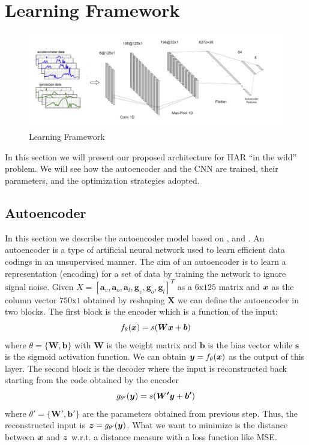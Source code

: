 \section{Learning Framework}
\label{sec:learning_framework}

\begin{figure}[h]
	\centering
	\includegraphics[width=1\textwidth]{images/full_architecture.jpg}
	\caption{Learning Framework}
	\label{fig:proposed-architecture}
\end{figure}

In this section we will present our proposed architecture for HAR ``in
the wild'' problem. We will see how the autoencoder and the CNN are
trained, their parameters, and the optimization strategies adopted.

\subsection{Autoencoder}
\label{subsec:autoencoder}

In this section we describe the autoencoder model based on
\cite{vincent2010stacked}, \cite{gu2018locomotion} and
\cite{gao2019human}. An autoencoder is a type of artificial neural
network used to learn efficient data codings in an unsupervised
manner. The aim of an autoencoder is to learn a representation
(encoding) for a set of data by training the network to ignore signal
noise. Given $X = [ \boldsymbol{a}_v, \boldsymbol{a}_o,
  \boldsymbol{a}_l, \boldsymbol{g}_v, \boldsymbol{g}_o,
  \boldsymbol{g}_l ]^T$ as a $6\text{x}125$ matrix and $\boldsymbol{x}$ as the
column vector $750\text{x}1$ obtained by reshaping $\boldsymbol{X}$ we
can define the autoencoder in two blocks. The first block is the
encoder which is a function of the input:
\begin{equation}
  f_\theta(\boldsymbol{x}) = s(\boldsymbol{W}\boldsymbol{x} + \boldsymbol{b})
\end{equation}
where $\theta = \{ \boldsymbol{W}, \boldsymbol{b} \}$ with
$\boldsymbol{W}$ is the weight matrix and $\boldsymbol{b}$ is the bias
vector while $\boldsymbol{s}$ is the sigmoid activation function. We
can obtain $\boldsymbol{y} = f_\theta(\boldsymbol{x})$ as the output of this
layer. The second block is the decoder where the input is
reconstructed back starting from the code obtained by the encoder
\begin{equation}
  g_{\theta'}(\boldsymbol{y}) = s(\boldsymbol{W'}\boldsymbol{y} + \boldsymbol{b'})
\end{equation}
where $\theta' = \{ \boldsymbol{W'}, \boldsymbol{b'} \}$ are the
parameters obtained from previous step. Thus, the reconstructed input
is $\boldsymbol{z} = g_{\theta'}(\boldsymbol{y})$. What we want to minimize is the distance
between $\boldsymbol{x}$ and $\boldsymbol{z}$ w.r.t. a distance measure with a loss function
like MSE.

